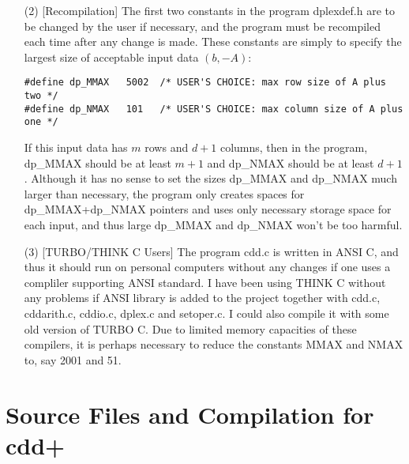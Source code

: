 \documentclass[11pt]{article}
\begin{document}
\begin{itemize}
\item[(2)] [Recompilation] The first two constants in the program dplexdef.h are to be 
changed by the user if necessary, and the program must be recompiled
each time after any change is made.   These constants are simply
to specify the largest size of acceptable input data $(b, -A)$: 
\begin{verbatim}
#define dp_MMAX   5002  /* USER'S CHOICE: max row size of A plus two */
#define dp_NMAX   101   /* USER'S CHOICE: max column size of A plus one */
\end{verbatim}
If this input data has $m$ rows and $d+1$ columns, then in the program,
dp\_MMAX should be at least $m+1$ and dp\_NMAX should be at least
$d+1$.  Although it has no sense to set the sizes 
dp\_MMAX and dp\_NMAX much larger
than necessary, the program only creates spaces 
for dp\_MMAX+dp\_NMAX pointers
and uses only necessary storage space for each input, and
thus large dp\_MMAX and dp\_NMAX won't be too harmful.


\item[(3)] [TURBO/THINK C Users] The program cdd.c is written in
ANSI C, and thus it should run on
personal computers without any changes if one uses a compliler supporting
ANSI standard. I have been using  THINK C without
any problems if ANSI library is added to the project together with
cdd.c, cddarith.c, cddio.c, dplex.c and setoper.c.  
I could also compile it with some
old version of TURBO C.  Due to limited memory capacities of
these compilers, it is perhaps necessary to reduce the constants MMAX and NMAX
to, say 2001 and 51.
\end{itemize}


\section{Source Files and Compilation for cdd+}  \label{sources_cdd+}
\end{document}
